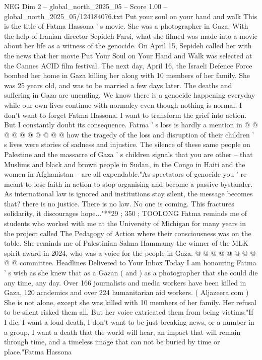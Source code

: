 \begin{textsample}{NEG Dim 2 – global\_north\_2025\_05 – Score 1.00 – global\_north\_2025\_05/124184076.txt}  \label{ex:f2_neg_035}
Put your soul on your hand and walk This is the title of Fatma Hassona ' s movie.
She was a photographer in Gaza.
With the help of Iranian director Sepideh Farsi, what she filmed was made into a movie about her life as a witness of the genocide.
On April 15, Sepideh called her with the news that her movie Put Your Soul on Your Hand and Walk was selected at the Cannes ACID film festival.
The next day, April 16, the Israeli Defence Force bombed her home in Gaza killing her along with 10 members of her family.
She was 25 years old, and was to be married a few days later.
The deaths and suffering in Gaza are unending.
We know there is a genocide happening everyday while our own lives continue with normalcy even though nothing is normal.
I don't want to forget Fatma Hassona.
I want to transform the grief into action.
But I constantly doubt its consequence.
Fatma ' s loss is hardly a mention in @ @ @ @ @ @ @ @ @ @ how the tragedy of the loss and disruption of their children ' s lives were stories of sadness and injustice.
The silence of these same people on Palestine and the massacre of Gaza ' s children signals that you are other -- that Muslims and black and brown people in Sudan, in the Congo in Haiti and the women in Afghanistan -- are all expendable."As spectators of genocide you ' re meant to lose faith in action to stop organising and become a passive bystander.
As international law is ignored and institutions stay silent, the message becomes that? there is no justice.
There is no law.
No one is coming.
This fractures solidarity, it discourages hope..."**29 ; 350 ; TOOLONG Fatma reminds me of students who worked with me at the University of Michigan for many years in the project called The Pedagogy of Action where their consciousness was on the table.
She reminds me of Palestinian Salma Hammamy the winner of the MLK spirit award in 2024, who was a voice for the people in Gaza. @ @ @ @ @ @ @ @ @ @ committee.
Headlines Delivered to Your Inbox Today I am honouring Fatma ' s wish as she knew that as a Gazan ( and ) as a photographer that she could die any time, any day.
Over 166 journalists and media workers have been killed in Gaza, 120 academics and over 224 humanitarian aid workers. ( Aljazeera.com ) She is not alone, except she was killed with 10 members of her family.
Her refusal to be silent risked them all.
But her voice extricated them from being victims."If I die, I want a loud death, I don't want to be just breaking news, or a number in a group, I want a death that the world will hear, an impact that will remain through time, and a timeless image that can not be buried by time or place."Fatma Hassona

\end{textsample}

